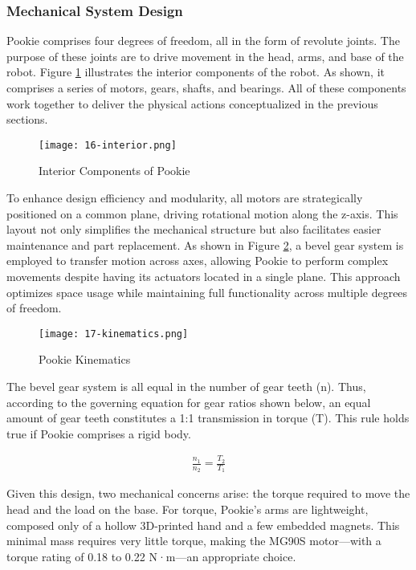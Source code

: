\subsubsection{Mechanical System Design}
Pookie comprises four degrees of freedom, all in the form of revolute joints. The purpose of these joints are to drive movement in the head, arms, and base of the robot. Figure \ref{fig:16-interior} illustrates the interior components of the robot. As shown, it comprises a series of motors, gears, shafts, and bearings. All of these components work together to deliver the physical actions conceptualized in the previous sections. 

\begin{figure}[!ht]
    \centering
    \texttt{[image: 16-interior.png]}
    \captionsetup{justification=centering}
    \caption{Interior Components of Pookie}
    \label{fig:16-interior}
\end{figure}

To enhance design efficiency and modularity, all motors are strategically positioned on a common plane, driving rotational motion along the z-axis. This layout not only simplifies the mechanical structure but also facilitates easier maintenance and part replacement. As shown in Figure \ref{fig:17-kinematics}, a bevel gear system is employed to transfer motion across axes, allowing Pookie to perform complex movements despite having its actuators located in a single plane. This approach optimizes space usage while maintaining full functionality across multiple degrees of freedom. 

\begin{figure}[!ht]
    \centering
    \texttt{[image: 17-kinematics.png]}
    \captionsetup{justification=centering}
    \caption{Pookie Kinematics}
    \label{fig:17-kinematics}
\end{figure}

The bevel gear system is all equal in the number of gear teeth (n). Thus, according to the governing equation for gear ratios shown below, an equal amount of gear teeth constitutes a 1:1 transmission in torque (T). This rule holds true if Pookie comprises a rigid body. 

\begin{gather}
    \frac{n_1}{n_2} = \frac{T_2}{T_1}
\end{gather}

Given this design, two mechanical concerns arise: the torque required to move the head and the load on the base. For torque, Pookie’s arms are lightweight, composed only of a hollow 3D-printed hand and a few embedded magnets. This minimal mass requires very little torque, making the MG90S motor—with a torque rating of 0.18 to 0.22 N·m—an appropriate choice.

